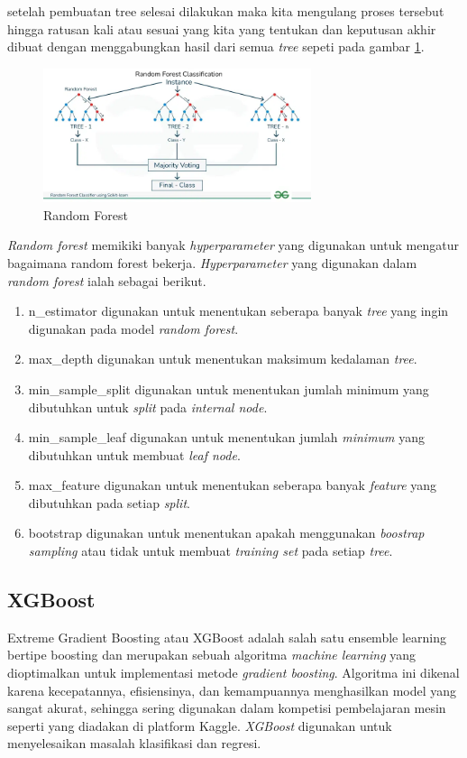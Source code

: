 setelah pembuatan tree selesai dilakukan maka kita mengulang proses tersebut hingga ratusan kali atau sesuai yang kita yang tentukan dan keputusan akhir dibuat dengan menggabungkan hasil dari semua \textit{tree} sepeti pada gambar \ref{fig:2.randomforest}.

\begin{figure}[H]
	\centering
	\includegraphics[width=0.7\textwidth]{figure/random_forest.png}
	\caption{Random Forest}
	\label{fig:2.randomforest}
\end{figure}
\textit{Random forest} memikiki banyak \textit{hyperparameter} yang digunakan untuk mengatur bagaimana random forest bekerja. \textit{Hyperparameter} yang digunakan dalam \textit{random forest} ialah sebagai berikut.
\begin{enumerate}[noitemsep]
    \item n\_estimator digunakan untuk menentukan seberapa banyak \textit{tree} yang ingin digunakan pada model \textit{random forest}.
    \item max\_depth digunakan untuk menentukan maksimum kedalaman \textit{tree}.
    \item min\_sample\_split digunakan untuk menentukan jumlah minimum yang dibutuhkan untuk \textit{split} pada \textit{internal node}.
    \item min\_sample\_leaf digunakan untuk menentukan jumlah \textit{minimum} yang dibutuhkan untuk membuat \textit{leaf node}.
    \item max\_feature digunakan untuk menentukan seberapa banyak \textit{feature} yang dibutuhkan pada setiap \textit{split}.
    \item bootstrap digunakan untuk menentukan apakah menggunakan \textit{boostrap sampling} atau tidak untuk membuat \textit{training set} pada setiap \textit{tree}.
\end{enumerate}

\subsection{XGBoost} \label{II.xgboost}
Extreme Gradient Boosting atau XGBoost adalah salah satu ensemble learning bertipe boosting dan merupakan sebuah algoritma \textit{machine learning} yang dioptimalkan untuk implementasi metode \textit{gradient boosting}\cite{chen2015xgboost}. Algoritma ini dikenal karena kecepatannya, efisiensinya, dan kemampuannya menghasilkan model yang sangat akurat, sehingga sering digunakan dalam kompetisi pembelajaran mesin seperti yang diadakan di platform Kaggle. \textit{XGBoost} digunakan untuk menyelesaikan masalah klasifikasi dan regresi\cite{chen2016xgboost}.

